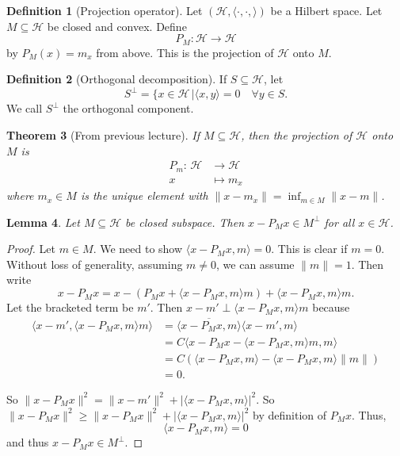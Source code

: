 \documentclass[10pt, oneside, reqno]{amsbook}
\theoremstyle{plain}%
\newtheorem{thm}{Theorem}[section]
\newtheorem{lem}[thm]{Lemma}
\theoremstyle{definition}
\newtheorem{defn}[thm]{Definition}
\theoremstyle{remark}
\newcommand{\Hil}{\mathcal{H}}
\newcommand{\mapping}[5]{\begin{align*}
    #1 : \,     #2 &\rightarrow #3 \\
            #4  &\mapsto #5
\end{align*}    
}
\newcommand{\hilb}{(\Hil, \langle \cdot, \cdot, \rangle )}
\begin{document}
\begin{defn}[Projection operator]
Let $\hilb$ be a Hilbert space.  Let $M \subseteq \Hil$ be closed and convex.  Define \[
    P_M : \Hil \rightarrow \Hil
\] by $P_M(x) = m_x$ from above. This is the projection of $\Hil$ onto $M$.
\end{defn}

\begin{defn}[Orthogonal decomposition]  
    If $S \subseteq \Hil$, let \[
        S^\perp = \{ x \in \Hil
 \, | \langle x, y \rangle = 0 \quad \forall y \in S. 
\] We call $S^\perp$ the orthogonal component.
\end{defn}



\begin{thm}[From previous lecture]
    If $M \subseteq \Hil$, then the projection of $\Hil$ onto $M$ is \mapping{P_m}{\Hil}{\Hil}{x}{m_x} where $m_x \in M$ is the unique element with $\| x - m_x \| = \inf_{m \in M} \| x - m \|$.  
\end{thm}

\begin{lem}
    Let $M \subseteq \Hil$ be closed subspace.  Then $x - P_M x \in M^{\perp}$ for all $x \in \Hil$.
\end{lem}

\begin{proof}
    Let $m \in M$.  We need to show $\langle x - P_M x , m \rangle = 0$.  This is clear if $m = 0$.  Without loss of generality, assuming $ m \neq 0$, we can assume $ \| m \| = 1$.  Then write \[
        x - P_M x = x - \left( P_M x + \langle x - P_M x, m \rangle m \right) + \langle x - P_M x, m \rangle m.
    \]   Let the bracketed term be $m'$.  Then $ x- m' \perp \langle x - P_M x, m \rangle m$ because 
    \begin{align*}
        \langle x - m', \langle x - P_M x, m \rangle m \rangle &= \overline{\langle x - P_M x, m \rangle} \langle x - m', m \rangle \\
        &= C \langle x - P_M x - \langle x - P_M x, m \rangle m, m \rangle \\
        &= C( \langle x - P_M x, m \rangle - \langle x - P_M x, m \rangle \| m \|) \\
        &= 0.
    \end{align*}
    
    So $\| x - P_M x \|^2 = \| x - m' \|^2 + | \langle x - P_M x, m \rangle |^2$.  So $\| x - P_M x \|^2 \geq \| x - P_M x\|^2 + | \langle x - P_M x, m \rangle |^2$ by definition of $P_M x$.  Thus, \[
        \langle x - P_M x, m \rangle = 0 
    \] and thus $x - P_M x \in M^\perp$.
\end{proof}
\end{document}
